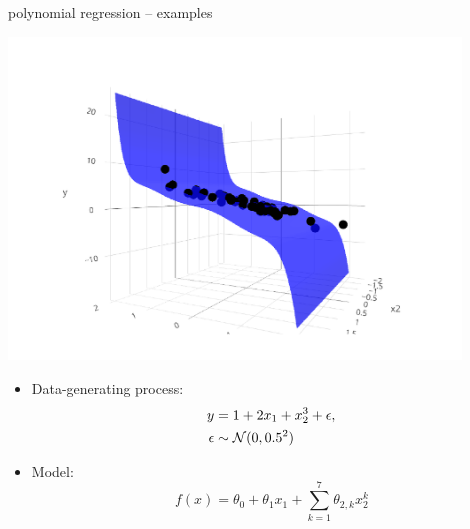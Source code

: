 \documentclass[11pt,compress,t,notes=noshow, xcolor=table]{beamer}
\begin{document}
\begin{frame}{polynomial regression -- examples}
\begin{minipage}[b]{0.5\textwidth}
  \includegraphics[width=0.9\textwidth, trim=80 80 80 80, clip]{
  figure/reg_poly_biv}
\end{minipage}
\begin{minipage}[b]{0.45\textwidth}
  \begin{itemize}
    \footnotesize
    \item
    Data-generating process: 
    \begin{align*}
      y &= 1 + 2 x_1 + x_2^3 + \epsilon, \\
      \epsilon &\sim \mathcal{N}(0, 0.5^2)
    \end{align*}
    \item Model: $$f(x) = \theta_0 + \theta_1 x_1 + 
    \sum_{k = 1}^7 \theta_{2, k} x_2^k$$
  \end{itemize}
\end{minipage}

\end{frame}

\end{document}
